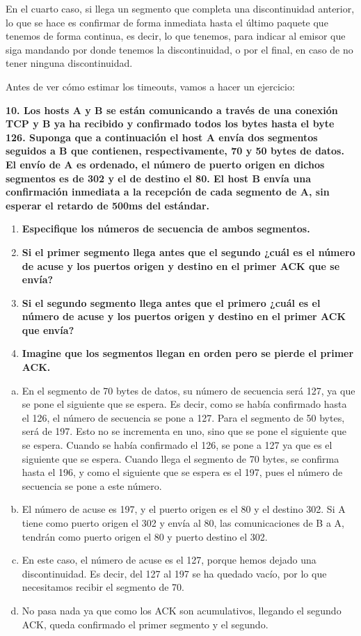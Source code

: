 \documentclass[10pt,a4paper,spanish]{report}
\begin{document}
En el cuarto caso, si llega un segmento que completa una discontinuidad anterior, lo que se hace es confirmar de forma inmediata hasta el último paquete que tenemos de forma continua, es decir, lo que tenemos, para indicar al emisor que siga mandando por donde tenemos la discontinuidad, o por el final, en caso de no tener ninguna discontinuidad. 

Antes de ver cómo estimar los timeouts, vamos a hacer un ejercicio:

\textbf{10. Los hosts A y B se están comunicando a través de una conexión TCP y B ya ha recibido y confirmado todos los bytes hasta el byte 126. Suponga que a continuación el host A envía dos segmentos seguidos a B que contienen, respectivamente, 70 y 50 bytes de datos. El envío de A es ordenado, el número de puerto origen en dichos segmentos es de 302 y el de destino el 80. El host B envía una confirmación inmediata a la recepción de cada segmento de A, sin esperar el retardo de 500ms del estándar.}
\begin{enumerate}[\bf a)]
  \item \textbf{Especifique los números de secuencia de ambos segmentos.}
  \item \textbf{Si el primer segmento llega antes que el segundo ¿cuál es el número de acuse y los puertos origen y destino en el primer ACK que se envía?}
  \item \textbf{Si el segundo segmento llega antes que el primero ¿cuál es el número de acuse y los puertos origen y destino en el primer ACK que envía?}
  \item \textbf{Imagine que los segmentos llegan en orden pero se pierde el primer ACK.}
\end{enumerate}

\begin{enumerate}[a)]
  \item En el segmento de 70 bytes de datos, su número de secuencia será 127, ya que se pone el siguiente que se espera. Es decir, como se había confirmado hasta el 126, el número de secuencia se pone a 127. Para el segmento de 50 bytes, será de 197. Esto no se incrementa en uno, sino que se pone el siguiente que se espera. Cuando se había confirmado el 126, se pone a 127 ya que es el siguiente que se espera. Cuando llega el segmento de 70 bytes, se confirma hasta el 196, y como el siguiente que se espera es el 197, pues el número de secuencia se pone a este número. 
  \item El número de acuse es 197, y el puerto origen es el 80 y el destino 302. Si A tiene como puerto origen el 302 y envía al 80, las comunicaciones de B a A, tendrán como puerto origen el 80 y puerto destino el 302.
  \item En este caso, el número de acuse es el 127, porque hemos dejado una discontinuidad. Es decir, del 127 al 197 se ha quedado vacío, por lo que necesitamos recibir el segmento de 70. 
  \item No pasa nada ya que como los ACK son acumulativos, llegando el segundo ACK, queda confirmado el primer segmento y el segundo.
\end{enumerate}
\end{document}
